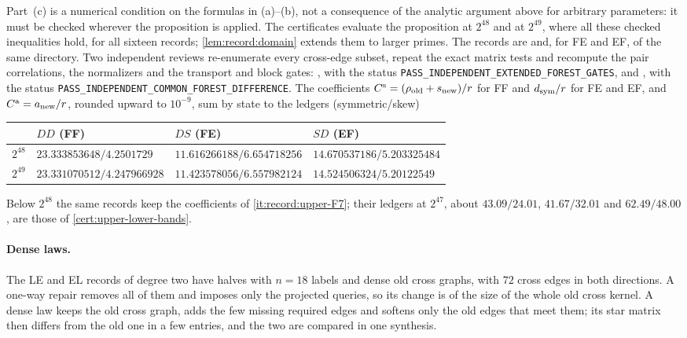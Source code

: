 Part~(c) is a numerical condition on the formulas in (a)--(b), not
a consequence of the analytic argument above for arbitrary
parameters: it must be checked wherever the proposition is applied.
The certificates evaluate the proposition at $2^{48}$ and at
$2^{49}$, where all these checked inequalities hold, for all sixteen
records; \cref{lem:record:domain} extends them to larger primes. The records are
and, for FE and EF,  of the same directory. Two
independent reviews re-enumerate every cross-edge subset, repeat the exact matrix
tests and recompute the pair correlations, the normalizers and the transport and
block gates: , with the status
\texttt{PASS\_\allowbreak INDEPENDENT\_\allowbreak EXTENDED\_\allowbreak FOREST\_\allowbreak GATES},
and , with the status
\texttt{PASS\_\allowbreak INDEPENDENT\_\allowbreak COMMON\_\allowbreak FOREST\_\allowbreak DIFFERENCE}. The
coefficients $C^{\rm s}=(\rho_{\rm old}+s_{\rm new})/r$ for FF and $d_{\rm sym}/r$
for FE and EF, and $C^{\rm a}=a_{\rm new}/r$, rounded upward to $10^{-9}$, sum by
state to the ledgers (symmetric/skew)
\begin{center}
\small
\begin{tabular}{@{}llll@{}}
\toprule
 & $DD$ (FF) & $DS$ (FE) & $SD$ (EF)\\
\midrule
$2^{48}$ & $23.333853648/4.2501729$ & $11.616266188/6.654718256$ & $14.670537186/5.203325484$\\
$2^{49}$ & $23.331070512/4.247966928$ & $11.423578056/6.557982124$ & $14.524506324/5.20122549$\\
\bottomrule
\end{tabular}
\end{center}
Below $2^{48}$ the same records keep the coefficients of \ref{it:record:upper-F7};
their ledgers at $2^{47}$, about $43.09/24.01$, $41.67/32.01$ and $62.49/48.00$, are
those of \cref{cert:upper-lower-bands}.

\paragraph{Dense laws.}
The LE and EL records of degree two have halves with $n=18$ labels and dense old
cross graphs, with $72$ cross edges in both directions. A one-way repair removes
all of them and imposes only the projected queries, so its change is of the size
of the whole old cross kernel. A dense law keeps the old cross graph, adds the
few missing required edges and softens only the old edges that meet them; its
star matrix then differs from the old one in a few entries, and the two are
compared in one synthesis.

